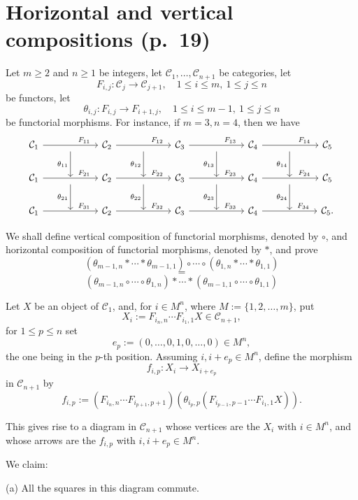 \documentclass[12pt]{article}
\theoremstyle{remark}%
\newcommand{\n}{\noindent}
\newcommand{\C}{\mathcal C}
\begin{document}
\section{Horizontal and vertical compositions (p.~19)}%
%
Let $m\ge2$ and $n\ge1$ be integers, let $\C_1,\dots,\C_{n+1}$ be categories, let 
$$
F_{i,j}:\C_j\to\C_{j+1},\quad1\le i\le m,\ 1\le j\le n
$$
be functors, let 
$$
\theta_{i,j}:F_{i,j}\to F_{i+1,j},\quad1\le i\le m-1,\ 1\le j\le n
$$
be functorial morphisms. For instance, if $m=3,n=4$, then we have 
$$
\begin{tikzcd}
%
\C_1\ar{rr}{}[near end]{F_{11}}&\ar{d}[swap]{\theta_{11}}&\C_2\ar{rr}{}[near end]{F_{12}}&\ar{d}[swap]{\theta_{12}}&\C_3\ar{rr}{}[near end]{F_{13}}&\ar{d}[swap]{\theta_{13}}&\C_4\ar{rr}{}[near end]{F_{14}}&\ar{d}[swap]{\theta_{14}}&\C_5\\ 
%
\C_1\ar{rr}{}[near end]{F_{21}}&{}\ar{d}[swap]{\theta_{21}}&\C_2\ar{rr}{}[near end]{F_{22}}&{}\ar{d}[swap]{\theta_{22}}&\C_3\ar{rr}{}[near end]{F_{23}}&{}\ar{d}[swap]{\theta_{23}}&\C_4\ar{rr}{}[near end]{F_{24}}&{}\ar{d}[swap]{\theta_{24}}&\C_5\\ 
%
\C_1\ar{rr}{}[near end]{F_{31}}&{}&\C_2\ar{rr}{}[near end]{F_{32}}&{}&\C_3\ar{rr}{}[near end]{F_{33}}&{}&\C_4\ar{rr}{}[near end]{F_{34}}&{}&\C_5.
\end{tikzcd}
$$ 

We shall define vertical composition of functorial morphisms, denoted by $\circ$, and horizontal composition of functorial morphisms, denoted by $*$, and prove 
$$
(\theta_{m-1,n}*\cdots*\theta_{m-1,1})\circ\cdots\circ(\theta_{1,n}*\cdots*\theta_{1,1})
$$ 
$$=$$
$$
(\theta_{m-1,n}\circ\cdots\circ\theta_{1,n})*\cdots*(\theta_{m-1,1}\circ\cdots\circ\theta_{1,1})
$$

Let $X$ be an object of $\C_1$, and, for $i\in M^n$, where $M:=\{1,2,\dots,m\}$, put 
$$
X_i:=F_{i_n,n}\cdots F_{i_1,1}X\in\C_{n+1},
$$
for $1\le p\le n$ set 
$$
e_p:=(0,\dots,0,1,0,\dots,0)\in M^n,
$$
the one being in the $p$-th position. Assuming $i,i+e_p\in M^n$, define the morphism 
$$
f_{i,p}:X_i\to X_{i+e_p}
$$
in $\C_{n+1}$ by 
$$
f_{i,p}:=(F_{i_n,n}\cdots F_{i_{p+1},p+1})(\theta_{i_p,p}(F_{i_{p-1},p-1}\cdots F_{i_1,1}X)).
$$

This gives rise to a diagram in $\C_{n+1}$ whose vertices are the $X_i$ with $i\in M^n$, and whose arrows are the $f_{i,p}$ with $i,i+e_p\in M^n$. 

We claim: 

\n(a) All the squares in this diagram commute. 
\end{document}
